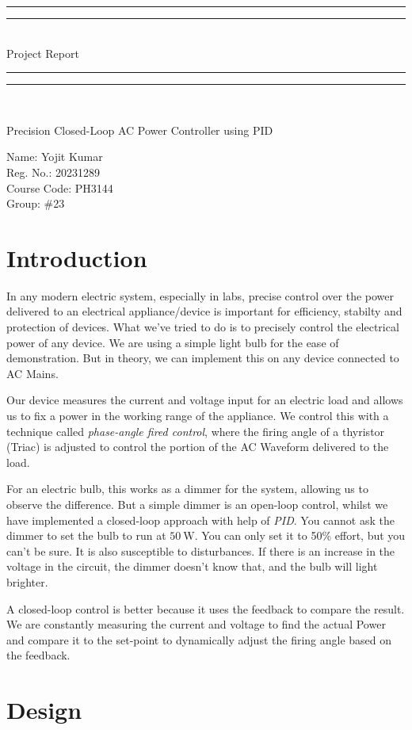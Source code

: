 \documentclass[11pt]{article}
\makeatletter
\newcommand*{\titleGP}{\begingroup
	\centering %
	\vspace*{\baselineskip} %

	\rule{\textwidth}{1.6pt}\vspace*{-\baselineskip}\vspace*{2pt} %
	\rule{\textwidth}{0.4pt}\\[\baselineskip] %
	{\LARGE Project Report}\\[0.2\baselineskip] %
	\rule{\textwidth}{0.4pt}\vspace*{-\baselineskip}\vspace{3.2pt} %
	\rule{\textwidth}{1.6pt}\\[2\baselineskip] %

	\vspace*{2in}
    
    	\Huge Precision Closed-Loop AC Power Controller using PID 
    	
	\vspace*{2in}
    

	\Large Name: Yojit Kumar\\
	\vspace*{0.2in}
	\Large Reg. No.: 20231289\\
	\vspace*{0.2in}
	\Large Course Code: PH3144\\
	\vspace*{0.2in}
	\Large Group: \#23\\

\endgroup}
\let\latexps@plain\ps@plain
\newcommand{\frontmatter}{\let\ps@plain\ps@empty\pagestyle{empty}}
\newcommand{\mainmatter}{%
  \let\ps@plain\latexps@plain\pagestyle{plain}%
  \clearpage
  \pagenumbering{arabic}}
\makeatother
\begin{document}
\frontmatter
\titleGP
\clearpage

\mainmatter
\section{Introduction}
In any modern electric system, especially in labs, precise control over the power delivered to an electrical appliance/device is important for efficiency, stabilty and protection of devices. What we've tried to do is to precisely control the electrical power of any device. We are using a simple light bulb for the ease of demonstration. But in theory, we can implement this on any device connected to AC Mains.

Our device measures the current and voltage input for an electric load and allows us to fix a power in the working range of the appliance. We control this with a technique called \emph{phase-angle fired control}, where the firing  angle of a thyristor (Triac) is adjusted to control the portion of the AC Waveform delivered to the load.

For an electric bulb, this works as a dimmer for the system, allowing us to observe the difference. But a simple dimmer is an open-loop control, whilst we have implemented a closed-loop approach with help of \emph{PID}. You cannot ask the dimmer to set the bulb to run at $\SI{50}{\watt}$. You can only set it to 50\% effort, but you can't be sure. It is also susceptible to disturbances. If there is an increase in the voltage in the circuit, the dimmer doesn't know that, and the bulb will light brighter.

A closed-loop control is better because it uses the feedback to compare the result. We are constantly measuring the current and voltage to find the actual Power and compare it to the set-point to dynamically adjust the firing angle based on the feedback.

\section{Design}
\end{document}
